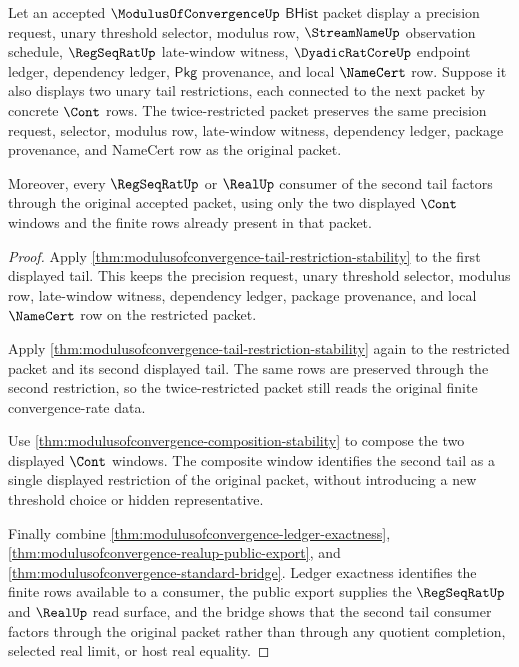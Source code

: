 \begin{theorem}
\label{thm:modulusofconvergence-synchronized-double-tail-restriction}
Let an accepted $\ModulusOfConvergenceUp$ $\mathsf{BHist}$ packet display a precision
request, unary threshold selector, modulus row, $\StreamNameUp$ observation
schedule, $\RegSeqRatUp$ late-window witness, $\DyadicRatCoreUp$ endpoint
ledger, dependency ledger, $\mathsf{Pkg}$ provenance, and local $\NameCert$
row. Suppose it also displays two unary tail restrictions, each connected to
the next packet by concrete $\Cont$ rows. The twice-restricted packet preserves
the same precision request, selector, modulus row, late-window witness,
dependency ledger, package provenance, and NameCert row as the original packet.

Moreover, every $\RegSeqRatUp$ or $\RealUp$ consumer of the second tail factors
through the original accepted packet, using only the two displayed $\Cont$
windows and the finite rows already present in that packet.
\end{theorem}
\begin{proof}
Apply \autoref{thm:modulusofconvergence-tail-restriction-stability} to the
first displayed tail. This keeps the precision request, unary threshold
selector, modulus row, late-window witness, dependency ledger, package
provenance, and local $\NameCert$ row on the restricted packet.

Apply \autoref{thm:modulusofconvergence-tail-restriction-stability} again to
the restricted packet and its second displayed tail. The same rows are preserved
through the second restriction, so the twice-restricted packet still reads the
original finite convergence-rate data.

Use \autoref{thm:modulusofconvergence-composition-stability} to compose the two
displayed $\Cont$ windows. The composite window identifies the second tail as a
single displayed restriction of the original packet, without introducing a new
threshold choice or hidden representative.

Finally combine \autoref{thm:modulusofconvergence-ledger-exactness},
\autoref{thm:modulusofconvergence-realup-public-export}, and
\autoref{thm:modulusofconvergence-standard-bridge}. Ledger exactness identifies
the finite rows available to a consumer, the public export supplies the
$\RegSeqRatUp$ and $\RealUp$ read surface, and the bridge shows that the second
tail consumer factors through the original packet rather than through any
quotient completion, selected real limit, or host real equality.
\end{proof}

